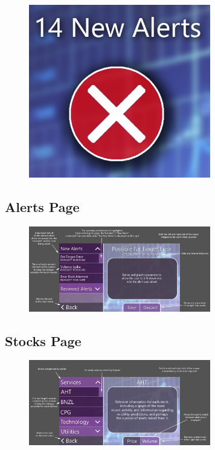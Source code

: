 \documentclass[11pt, oneside, a4paper]{article}
\begin{document}
\begin{figure}[h]
	\centering
		\includegraphics[width=300px]{HomepageUIDesignAlerts.png}
	\caption{}
	\label{HomeUIAlerts}
\end{figure}

\subsection{Alerts Page}

\begin{figure}[h]
	\centering
		\includegraphics[width=300px]{AlertsUIDesign.png}
	\caption{}
	\label{AlertsUI}
\end{figure}

\subsection{Stocks Page}

\begin{figure}[h]
	\centering
		\includegraphics[width=300px]{StocksUIDesign.png}
	\caption{}
	\label{StocksUI}
\end{figure}
\end{document}
